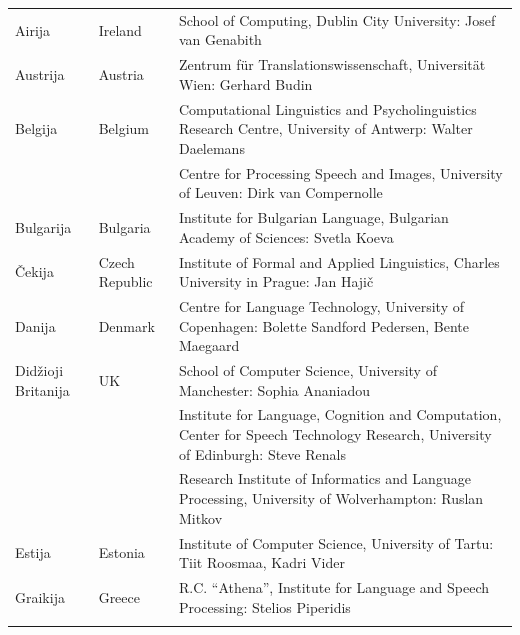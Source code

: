 \small
\begin{longtable}{llp{105mm}}
  Airija & \textcolor{grey1}{Ireland} & School of Computing, Dublin City University: Josef van Genabith\\ \addlinespace
  
  Austrija & \textcolor{grey1}{Austria} & Zentrum für Translationswissenschaft, Universität Wien: Gerhard Budin\\ \addlinespace
  
  Belgija & \textcolor{grey1}{Belgium} & Computational Linguistics and Psycholinguistics Research Centre, University of Antwerp: Walter Daelemans\\ \addlinespace
  & & Centre for Processing Speech and Images, University of Leuven: Dirk van Compernolle \\ \addlinespace
  
  Bulgarija & \textcolor{grey1}{Bulgaria} & Institute for Bulgarian Language, Bulgarian Academy of Sciences: Svetla Koeva \\ \addlinespace
  
  Čekija & \textcolor{grey1}{Czech Republic} & Institute of Formal and Applied Linguistics, Charles University in Prague: Jan Hajič \\ \addlinespace
  
  Danija &  \textcolor{grey1}{Denmark} & Centre for Language Technology, University of Copenhagen: \newline Bolette Sandford Pedersen, Bente Maegaard\\ \addlinespace
  
  Didžioji Britanija & \textcolor{grey1}{UK} & School of Computer Science, University of Manchester: Sophia Ananiadou \\ \addlinespace 
  & & Institute for Language, Cognition and Computation, Center for Speech Technology Research, University of Edinburgh: Steve Renals \\ \addlinespace 
  & & Research Institute of Informatics and Language Processing, University of Wolverhampton: Ruslan Mitkov \\ \addlinespace
  
  Estija & \textcolor{grey1}{Estonia} & Institute of Computer Science, University of Tartu: Tiit Roosmaa, Kadri Vider\\ \addlinespace
  
  Graikija & \textcolor{grey1}{Greece} & R.C. “Athena”, Institute for Language and Speech Processing: Stelios Piperidis\\ \addlinespace
  

\end{longtable}
